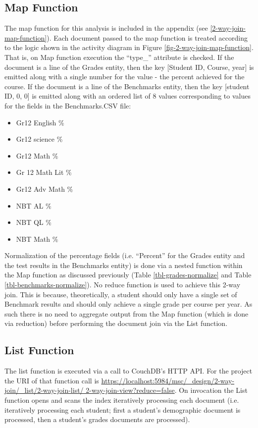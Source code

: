 \subsection{Map Function}
The map function for this analysis is included in the appendix (see \ref{2-way-join-map-function}). Each document passed to the map function is treated according to the logic shown in the activity diagram in Figure \ref{fig-2-way-join-map-function}. That is, on Map function execution the ``type\_'' attribute is checked. If the document is a line of the Grades entity, then the key [Student ID, Course, year] is emitted along with a single number for the value - the percent achieved for the course. If the document is a line of the Benchmarks entity, then the key [student ID, 0, 0] is emitted along with an ordered list of 8 values corresponding to values for the fields in the Benchmarks.CSV file:

\begin{itemize}
  \item Gr12 English \%
  \item Gr12 science \%
  \item Gr12 Math \%
  \item Gr 12 Math Lit \%
  \item Gr12 Adv Math \%
  \item NBT AL \%
  \item NBT QL \%
  \item NBT Math \%
\end{itemize}

Normalization of the percentage fields (i.e. ``Percent'' for the Grades entity and the test results in the Benchmarks entity) is done via a nested function within the Map function as discussed previously (Table \ref{tbl-grades-normalize} and Table \ref{tbl-benchmarks-normalize}). No reduce function is used to achieve this 2-way join. This is because, theoretically, a student should only have a single set of Benchmark results and should only achieve a single grade per course per year. As such there is no need to aggregate output from the Map function (which is done via reduction) before performing the document join via the List function.



\subsection{List Function}
The list function is executed via a call to CouchDB's HTTP API. For the project the URI of that function call is \url{https://localhost:5984/msc/\_design/2-way-join/\_list/2-way-join-list/ 2-way-join-view?reduce=false}. On invocation the List function opens and scans the index iteratively processing each document (i.e. iteratively processing each student; first a student's demographic document is processed, then a student's grades documents are processed).

